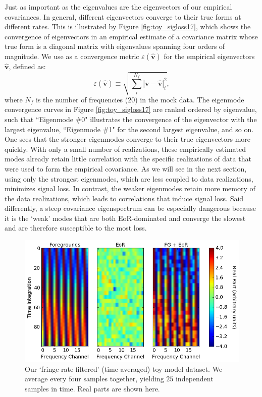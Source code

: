 \documentclass[preprint2,numberedappendix,tighten]{aastex6}  %
\newcommand{\acl}[1]{{\color{red} \textbf{[ACL:  #1]}}}
\begin{document}
Just as important as the eigenvalues are the eigenvectors of our empirical covariances. In general, different eigenvectors converge to their true forms at different rates. This is illustrated by Figure \ref{fig:toy_sigloss17}, which shows the convergence of eigenvectors in an empirical estimate of a covariance matrix whose true form is a diagonal matrix with eigenvalues spanning four orders of magnitude. We use as a convergence metric $\varepsilon(\widehat{\textbf{v}})$ for the empirical eigenvectors $\widehat{\textbf{v}}$, defined as:
\begin{equation}
\label{eq:converge_eig}
\varepsilon (\widehat{\textbf{v}}) \equiv \sqrt{\sum_{i}^{N_{f}}|\textbf{v}-\widehat{\textbf{v}}|_{i}^2},
\end{equation}
where $N_{f}$ is the number of frequencies ($20$) in the mock data. The eigenmode convergence curves  in Figure \ref{fig:toy_sigloss17} are ranked ordered by eigenvalue, such that ``Eigenmode \#0" illustrates the convergence of the eigenvector with the largest eigenvalue, ``Eigenmode \#1" for the second largest eigenvalue, and so on. One sees that the stronger eigenmodes converge to their true eigenvectors more quickly. With only a small number of realizations, these empirically estimated modes already retain little correlation with the specific realizations of data that were used to form the empirical covariance. As we will see in the next section, using only the strongest eigenmodes, which are less coupled to data realizations, minimizes signal loss. In contrast, the weaker eigenmodes retain more memory of the data realizations, which leads to correlations that induce signal loss. Said differently, a steep covariance eigenspectrum can be especially dangerous because it is the `weak' modes that are both EoR-dominated and converge the slowest and are therefore susceptible to the most loss.  %

\begin{figure}
	\centering
	\includegraphics[width=\columnwidth]{plots/toy_sigloss5.png}
	\caption{Our `fringe-rate filtered' (time-averaged) toy model dataset. We average every four samples together, 
yielding $25$ independent samples in time. Real parts are shown here.}
	\label{fig:toy_sigloss5}
\end{figure}
\end{document}
